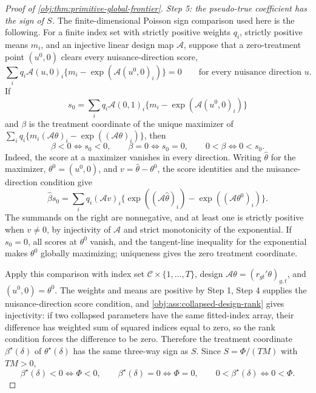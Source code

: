\documentclass[11pt]{article}
\begin{document}
\begin{proof}[Proof of \cref{obj:thm:primitive-global-frontier}]
\textit{Step 5: the pseudo-true coefficient has the sign of \(S\).} The finite-dimensional Poisson sign comparison used here is the following. For a finite index set with strictly positive weights \(q_i\), strictly positive means \(m_i\), and an injective linear design map \(\mathscr A\), suppose that a zero-treatment point \((u^0,0)\) clears every nuisance-direction score,
\[
\sum_i q_i \mathscr A(u,0)_i\{m_i-\exp(\mathscr A(u^0,0)_i)\}=0
\qquad\text{for every nuisance direction }u.
\]
If
\[
s_0=\sum_i q_i \mathscr A(0,1)_i\{m_i-\exp(\mathscr A(u^0,0)_i)\}
\]
and \(\beta\) is the treatment coordinate of the unique maximizer of
\(\sum_i q_i\{m_i(\mathscr A\theta)_i-\exp((\mathscr A\theta)_i)\}\), then
\[
\beta<0\iff s_0<0,
\qquad
\beta=0\iff s_0=0,
\qquad
0<\beta\iff 0<s_0 .
\]
Indeed, the score at a maximizer vanishes in every direction. Writing \(\widehat\theta\) for the maximizer, \(\theta^0=(u^0,0)\), and \(v=\widehat\theta-\theta^0\), the score identities and the nuisance-direction condition give
\[
\widehat\beta s_0
=
\sum_i q_i(\mathscr A v)_i\{\exp((\mathscr A\widehat\theta)_i)-\exp((\mathscr A\theta^0)_i)\} .
\]
The summands on the right are nonnegative, and at least one is strictly positive when \(v\neq0\), by injectivity of \(\mathscr A\) and strict monotonicity of the exponential. If \(s_0=0\), all scores at \(\theta^0\) vanish, and the tangent-line inequality for the exponential makes \(\theta^0\) globally maximizing; uniqueness gives the zero treatment coordinate.

Apply this comparison with index set \(\mathcal C\times\{1,\ldots,T\}\), design \(\mathscr A\theta=(r_{gt}'\theta)_{g,t}\), and \((u^0,0)=\theta^0\). The weights and means are positive by Step 1, Step 4 supplies the nuisance-direction score condition, and \cref{obj:ass:collapsed-design-rank} gives injectivity: if two collapsed parameters have the same fitted-index array, their difference has weighted sum of squared indices equal to zero, so the rank condition forces the difference to be zero. Therefore the treatment coordinate \(\beta^\star(\delta)\) of \(\theta^\star(\delta)\) has the same three-way sign as \(S\). Since \(S=\Phi/(TM)\) with \(TM>0\),
\[
\beta^\star(\delta)<0\iff \Phi<0,
\qquad
\beta^\star(\delta)=0\iff \Phi=0,
\qquad
0<\beta^\star(\delta)\iff 0<\Phi .
\]


\end{proof}
\end{document}
